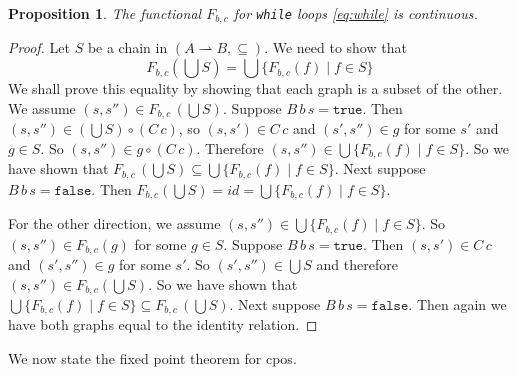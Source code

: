 \documentclass{tufte-handout}
\newcommand{\TRUE}[0]{\mathtt{true}}
\newcommand{\FALSE}[0]{\mathtt{false}}
\newcommand{\pto}[0]{\rightharpoonup}
\newtheorem{proposition}[theorem]{Proposition}
\begin{document}
\begin{proposition}
  The functional $F_{b,c}$ for \texttt{while} loops \eqref{eq:while}
  is continuous.
\end{proposition}
\begin{proof}
  Let $S$ be a chain in $(A\pto B,\subseteq)$. 
  We need to show that
  \[
  F_{b,c}(\bigcup S) = \bigcup \{ F_{b,c}(f) \mid f \in S\}
  \]
  We shall prove this equality by showing that each graph is a subset
  of the other.  We assume $(s,s'') \in F_{b,c}\,(\bigcup S)$.
  Suppose $B\,b\,s = \TRUE$.  Then $(s,s'') \in (\bigcup S) \circ (C
  \, c)$, so $(s,s') \in C\,c$ and $(s',s'') \in g$ for some $s'$ and
  $g \in S$. So $(s,s'') \in g \circ (C\, c)$.  Therefore $(s,s'') \in
  \bigcup \{ F_{b,c}(f) \mid f \in S \}$.  So we have shown that
  $F_{b,c}\,(\bigcup S) \subseteq \bigcup \{ F_{b,c}(f) \mid f \in S
  \}$. Next suppose $B\,b\,s = \FALSE$.  Then
  $
  F_{b,c}(\bigcup S) = \mathit{id} = \bigcup \{ F_{b,c}(f) \mid f \in S\}
  $.

  For the other direction, we assume $(s,s'') \in \bigcup \{
  F_{b,c}(f) \mid f \in S\}$. So $(s,s'') \in F_{b,c}(g)$ for some $g
  \in S$.  Suppose $B\,b\,s = \TRUE$.  Then $(s,s') \in C\,c$ and
  $(s',s'') \in g$ for some $s'$. So $(s',s'') \in \bigcup S$ and
  therefore $(s,s'') \in F_{b,c}(\bigcup S)$.  So we have shown that
  $\bigcup \{ F_{b,c}(f) \mid f \in S \} \subseteq F_{b,c}\,(\bigcup
  S)$. Next suppose $B\,b\,s = \FALSE$. Then again we have both graphs
  equal to the identity relation.
\end{proof}

We now state the fixed point theorem for cpos.
\end{document}
